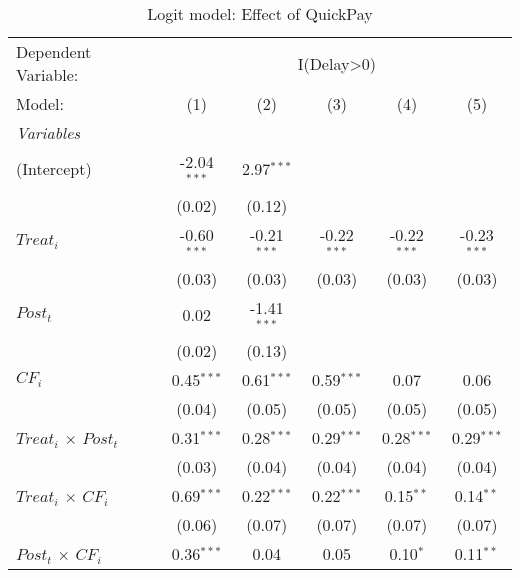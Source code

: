 \documentclass[
]{article}
\begin{document}
\begin{table}[htbp]
   \centering
   \caption{Logit model: Effect of QuickPay}
   \begin{tabular}{lccccc}
      \tabularnewline\midrule\midrule
      Dependent Variable: & \multicolumn{5}{c}{I(Delay>0)}\\
      Model:                                        & (1)           & (2)           & (3)           & (4)           & (5)\\
      \midrule \emph{Variables} &   &   &   &   &  \\
      (Intercept)                                   & -2.04$^{***}$ & 2.97$^{***}$  &               &               &   \\
                                                    & (0.02)        & (0.12)        &               &               &   \\
      $Treat_i$                                     & -0.60$^{***}$ & -0.21$^{***}$ & -0.22$^{***}$ & -0.22$^{***}$ & -0.23$^{***}$\\
                                                    & (0.03)        & (0.03)        & (0.03)        & (0.03)        & (0.03)\\
      $Post_t$                                      & 0.02          & -1.41$^{***}$ &               &               &   \\
                                                    & (0.02)        & (0.13)        &               &               &   \\
      $CF_i$                                        & 0.45$^{***}$  & 0.61$^{***}$  & 0.59$^{***}$  & 0.07          & 0.06\\
                                                    & (0.04)        & (0.05)        & (0.05)        & (0.05)        & (0.05)\\
      $Treat_i$ $\times$ $Post_t$                  & 0.31$^{***}$  & 0.28$^{***}$  & 0.29$^{***}$  & 0.28$^{***}$  & 0.29$^{***}$\\
                                                    & (0.03)        & (0.04)        & (0.04)        & (0.04)        & (0.04)\\
      $Treat_i$ $\times$ $CF_i$                    & 0.69$^{***}$  & 0.22$^{***}$  & 0.22$^{***}$  & 0.15$^{**}$   & 0.14$^{**}$\\
                                                    & (0.06)        & (0.07)        & (0.07)        & (0.07)        & (0.07)\\
      $Post_t$ $\times$ $CF_i$                     & 0.36$^{***}$  & 0.04          & 0.05          & 0.10$^{*}$    & 0.11$^{**}$\\

\end{tabular}
\end{table}
\end{document}
